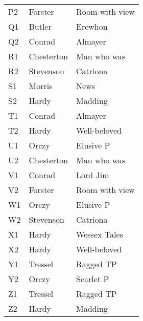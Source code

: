 \begin{table}[H]
\begin{tabular}{l l l}
    P2 & Forster & Room with view \\
    Q1 & Butler & Erewhon \\
    Q2 & Conrad & Almayer \\
    R1 & Chesterton & Man who was \\
    R2 & Stevenson & Catriona \\
    S1 & Morris & News \\
    S2 & Hardy & Madding \\
    T1 & Conrad & Almayer \\
    T2 & Hardy & Well-beloved \\
    U1 & Orczy & Elusive P \\
    U2 & Chesterton & Man who was \\
    V1 & Conrad & Lord Jim \\
    V2 & Forster & Room with view \\
    W1 & Orczy & Elusive P \\
    W2 & Stevenson & Catriona \\
    X1 & Hardy & Wessex Tales \\
    X2 & Hardy & Well-beloved \\
    Y1 & Tressel & Ragged TP \\
    Y2 & Orczy & Scarlet P \\
    Z1 & Tressel & Ragged TP \\
    Z2 & Hardy & Madding \\
    \bottomrule
  \end{tabular}
\end{table}

